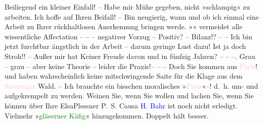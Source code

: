 \pstart
           {\pb}Beiliegend ein kleiner Einfall! – Habe mir Mühe gegeben, nicht
               »schlampig« zu arbeiten. Ich hoffe auf Ihren Beifall! – Bin neugierig, wann und ob
               ich einmal eine Arbeit zu Ihrer rückhaltlosen Anerkennung bringen werde. »\label{K_L03695-4v}\label{}« vermeidet alle wissentliche Affectation – – – negativer Vorzug –
               Positiv? – Bilanz!? – – Ich bin jetzt furchtbar ängstlich in der Arbeit – darum
               geringe Lust dazu! Ist ja doch Stroh!! – Außer mir hat Keiner Freude davon und in
               fünfzig Jahren? – – –. Grau – grau – aber keine Theorie – leider die Praxis!– – –
               Doch Sie kommen aus \textcolor{pink}{Paris}{}\ledrightnote{\textcolor{pink}{Paris}}! und haben
               wahrscheinlich keine mitschwingende Saite für die Klage aus dem \textcolor{pink}{Sievringer}{}\ledrightnote{\textcolor{pink}{Sievering}} Wald. – Ich brauchte ein bisschen moralisches »\textcolor{pink}{Paris}{}\ledrightnote{\textcolor{pink}{Paris}}«–! d. h. um- und aufgekrempelt zu werden.
               Weinen Sie, wenn Sie wollen und lachen Sie, wenn Sie können über Ihre\pend
           \pstart \spacefill\mbox{ElsaPlessner}\pend{}
\pstart
           \noindent{}P. S. Causa \textcolor{blue}{H. Bahr}{}\ledrightnote{\textcolor{blue}{Hermann Bahr}} ist noch nicht
                  erledigt. Vielmehr »\textcolor{green}{gläserner Käfig}{}\ledrightnote{\textcolor{green}{Der gläserne Käfig. Eine Parabel}}«
                  hinzugekommen. Doppelt hält besser.\pend
           \endnumbering{}
\begin{anhang}
\end{anhang}
      